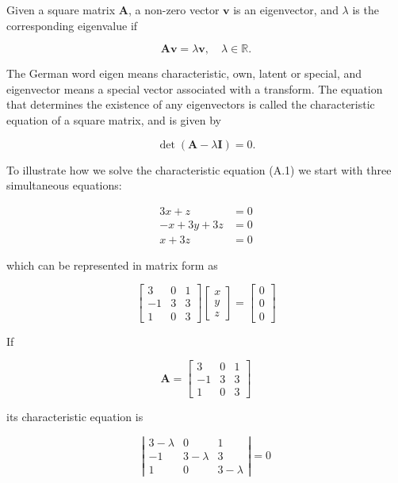 Given a square matrix $\mathbf{A}$, a non-zero vector $\mathbf{v}$ is an eigenvector, and $\lambda$ is the corresponding eigenvalue if

$$
\mathbf{A v}=\lambda \mathbf{v}, \quad \lambda \in \mathbb{R} .
$$

The German word eigen means characteristic, own, latent or special, and eigenvector means a special vector associated with a transform. The equation that determines the existence of any eigenvectors is called the characteristic equation of a square matrix, and is given by

$$
\operatorname{det}(\mathbf{A}-\lambda \mathbf{I})=0 .
$$

To illustrate how we solve the characteristic equation (A.1) we start with three simultaneous equations:

$$
\begin{aligned}
3 x+z & =0 \\
-x+3 y+3 z & =0 \\
x+3 z & =0
\end{aligned}
$$

which can be represented in matrix form as

$$
\left[\begin{array}{ccc}
3 & 0 & 1 \\
-1 & 3 & 3 \\
1 & 0 & 3
\end{array}\right]\left[\begin{array}{l}
x \\
y \\
z
\end{array}\right]=\left[\begin{array}{l}
0 \\
0 \\
0
\end{array}\right]
$$

If

$$
\mathbf{A}=\left[\begin{array}{ccc}
3 & 0 & 1 \\
-1 & 3 & 3 \\
1 & 0 & 3
\end{array}\right]
$$

its characteristic equation is

$$
\left|\begin{array}{ccc}
3-\lambda & 0 & 1 \\
-1 & 3-\lambda & 3 \\
1 & 0 & 3-\lambda
\end{array}\right|=0
$$

